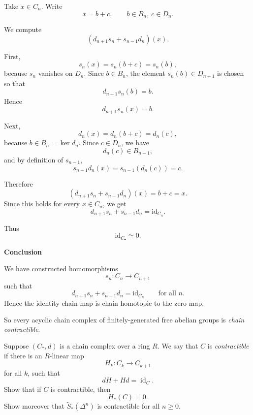 \begin{solution}
Take \(x\in C_n\). Write
\[
x=b+c,
\qquad
b\in B_n,\ c\in D_n.
\]

We compute
\[
(d_{n+1}s_n+s_{n-1}d_n)(x).
\]

First,
\[
s_n(x)=s_n(b+c)=s_n(b),
\]
because \(s_n\) vanishes on \(D_n\). Since \(b\in B_n\), the element \(s_n(b)\in D_{n+1}\) is chosen so that
\[
d_{n+1}s_n(b)=b.
\]
Hence
\[
d_{n+1}s_n(x)=b.
\]

Next,
\[
d_n(x)=d_n(b+c)=d_n(c),
\]
because \(b\in B_n=\ker d_n\). Since \(c\in D_n\), we have
\[
d_n(c)\in B_{n-1},
\]
and by definition of \(s_{n-1}\),
\[
s_{n-1}d_n(x)=s_{n-1}(d_n(c))=c.
\]

Therefore
\[
(d_{n+1}s_n+s_{n-1}d_n)(x)=b+c=x.
\]
Since this holds for every \(x\in C_n\), we get
\[
d_{n+1}s_n+s_{n-1}d_n=\mathrm{id}_{C_n}.
\]

Thus
\[
\mathrm{id}_{C_\bullet}\simeq 0.
\]


\medskip
\noindent\textbf{Conclusion}\par
\smallskip


We have constructed homomorphisms
\[
s_n:C_n\to C_{n+1}
\]
such that
\[
d_{n+1}s_n+s_{n-1}d_n=\mathrm{id}_{C_n}
\qquad\text{for all }n.
\]
Hence the identity chain map is chain homotopic to the zero map.

So every acyclic chain complex of finitely-generated free abelian groups is \emph{chain contractible}.

\par
\end{solution}

\begin{problem}
Suppose \((C_*,d)\) is a chain complex over a ring \(R\). We say that \(C\) is \emph{contractible} if there is an \(R\)-linear map
\[
H_k : C_k \to C_{k+1}
\]
for all \(k\), such that
\[
dH + Hd = \operatorname{id}_C.
\]
Show that if \(C\) is contractible, then
\[
H_*(C)=0.
\]
Show moreover that \(\widetilde{S}_*(\Delta^n)\) is contractible for all \(n \ge 0\).
\end{problem}

